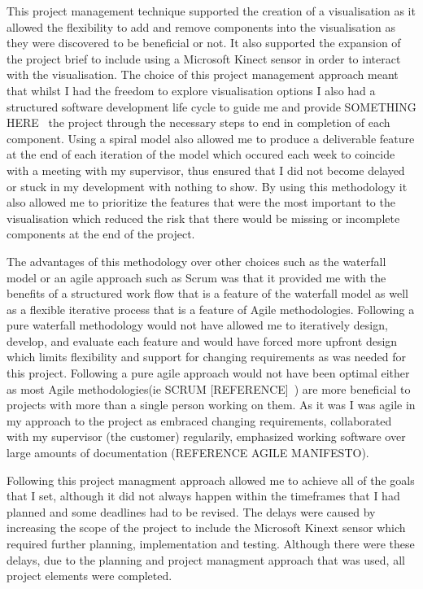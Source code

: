 This project management technique supported the creation of a visualisation as it allowed the flexibility to add and remove components into the visualisation as they were discovered to be beneficial or not. It also supported the expansion of the project brief to include using a Microsoft Kinect sensor in order to interact with the visualisation. The choice of this project management approach meant that whilst I had the freedom to explore visualisation options I also had a structured software development life cycle to guide me and provide SOMETHING HERE~ the project through the necessary steps to end in completion of each component.
%
Using a spiral model also allowed me to produce a deliverable feature at the end of each iteration of the model which occured each week to coincide with a meeting with my supervisor, thus ensured that I did not become delayed or stuck in my development with nothing to show. By using this methodology it also allowed me to prioritize the features that were the most important to the visualisation which reduced the risk that there would be missing or incomplete components at the end of the project. 

The advantages of this methodology over other choices such as the waterfall model or an agile approach such as Scrum was that it provided me with the benefits of a structured work flow that is a feature of the waterfall model as well as a flexible iterative process that is a feature of Agile methodologies. Following a pure waterfall methodology would not have allowed me to iteratively design, develop, and evaluate each feature and would have forced more upfront design which limits flexibility and support for changing requirements as was needed for this project. Following a pure agile approach would not have been optimal either as most Agile methodologies(ie SCRUM [REFERENCE]~) are more beneficial to projects with more than a single person working on them. As it was I was agile in my approach to the project as embraced changing requirements, collaborated with my supervisor (the customer) regularily, emphasized working software over large amounts of documentation (REFERENCE AGILE MANIFESTO). 

Following this project managment approach allowed me to achieve all of the goals that I set, although it did not always happen within the timeframes that I had planned and some deadlines had to be revised. The delays were caused by increasing the scope of the project to include the Microsoft Kinext sensor which required further planning, implementation and testing. Although there were these delays, due to the planning and project managment approach that was used, all project elements were completed.

